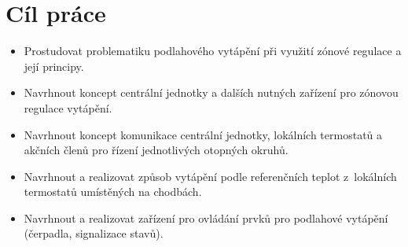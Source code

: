 \section{Cíl práce}
\begin{itemize}
\item Prostudovat problematiku podlahového vytápění při využití zónové regulace a její principy.
\item Navrhnout koncept centrální jednotky a dalších nutných zařízení pro zónovou regulace vytápění.
\item Navrhnout koncept komunikace centrální jednotky, lokálních termostatů a akčních členů pro řízení jednotlivých otopných okruhů.
\item Navrhnout a realizovat způsob vytápění podle referenčních teplot z~lokálních termostatů umístěných na chodbách.
\item Navrhnout a realizovat zařízení pro ovládání prvků pro podlahové vytápění (čerpadla, signalizace stavů).

\end{itemize}